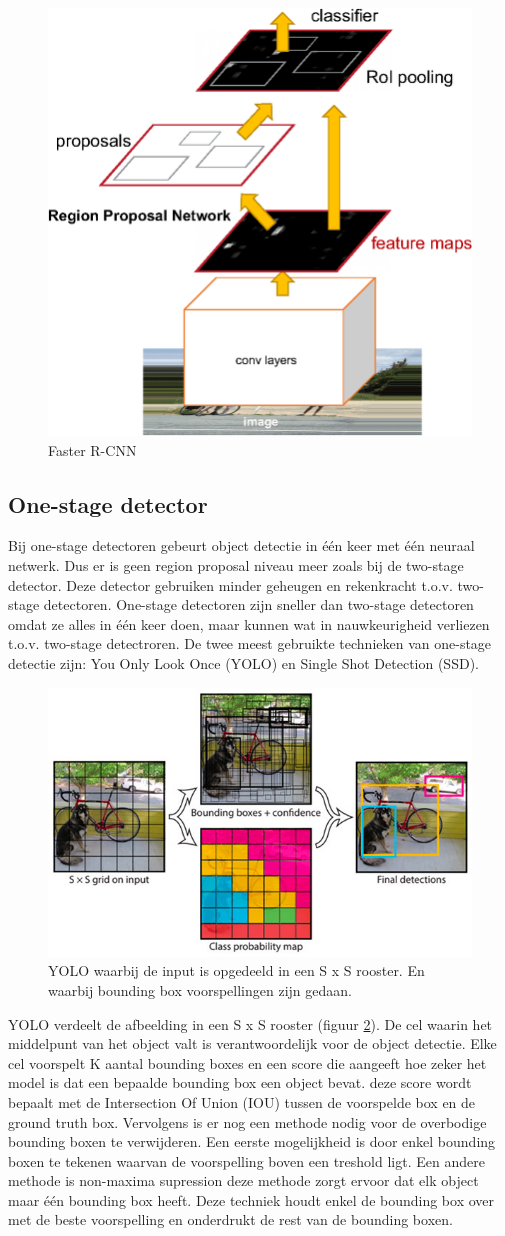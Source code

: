 \begin{figure}[!ht]
    \centering
 	\includegraphics[width=0.3\linewidth]{fig/Faster-R-CNN.png}
 	\caption{Faster R-CNN}
 	\label{fig:faster-r-cnn}
\end{figure}

\subsection{One-stage detector}
Bij one-stage detectoren gebeurt object detectie in \'e\'en keer met \'e\'en neuraal netwerk. 
Dus er is geen region proposal niveau meer zoals bij de two-stage detector. 
Deze detector gebruiken minder geheugen en rekenkracht t.o.v. two-stage detectoren.
One-stage detectoren zijn sneller dan two-stage detectoren omdat ze alles in \'e\'en keer doen, maar kunnen wat in nauwkeurigheid verliezen t.o.v. two-stage detectroren.
De twee meest gebruikte technieken van one-stage detectie zijn: You Only Look Once (YOLO) en Single Shot Detection (SSD).

\begin{figure}[!ht]
	\centering
	\includegraphics[width=0.60\linewidth]{fig/YOLO.jpg}
	\caption{YOLO waarbij de input is opgedeeld in een S x S rooster. 
	En waarbij bounding box voorspellingen zijn gedaan.}
	\label{fig:yolo}
\end{figure}

YOLO verdeelt de afbeelding in een S x S rooster (figuur \ref{fig:yolo}). 
De cel waarin het middelpunt van het object valt is verantwoordelijk voor de object detectie.
Elke cel voorspelt K aantal bounding boxes en een score die aangeeft hoe zeker het model is dat een bepaalde bounding box een object bevat.
deze score wordt bepaalt met de Intersection Of Union (IOU) tussen de voorspelde box en de ground truth box.
Vervolgens is er nog een methode nodig voor de overbodige bounding boxen te verwijderen. 
Een eerste mogelijkheid is door enkel bounding boxen te tekenen waarvan de voorspelling boven een treshold ligt. 
Een andere methode is non-maxima supression deze methode zorgt ervoor dat elk object maar \'e\'en bounding box heeft. 
Deze techniek houdt enkel de bounding box over met de beste voorspelling en onderdrukt de rest van de bounding boxen. 

